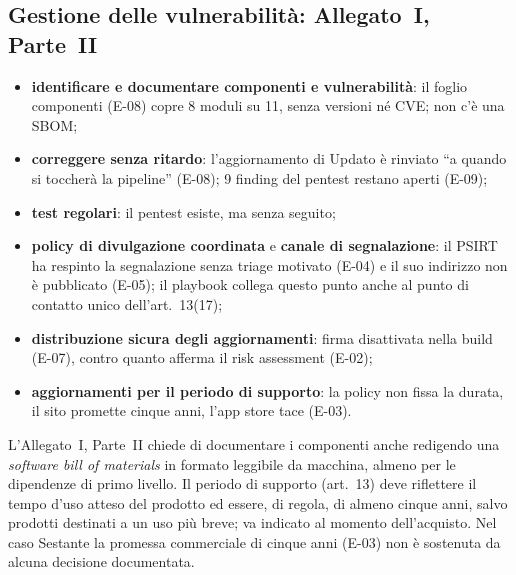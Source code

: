 \subsection{Gestione delle vulnerabilità: Allegato~I, Parte~II}
\begin{itemize}
  \item \textbf{identificare e documentare componenti e vulnerabilità}: il foglio componenti (E-08)
    copre 8 moduli su 11, senza versioni né CVE; non c'è una SBOM;
  \item \textbf{correggere senza ritardo}: l'aggiornamento di Updato è rinviato ``a quando si
    toccherà la pipeline'' (E-08); 9 finding del pentest restano aperti (E-09);
  \item \textbf{test regolari}: il pentest esiste, ma senza seguito;
  \item \textbf{policy di divulgazione coordinata} e \textbf{canale di segnalazione}: il PSIRT ha
    respinto la segnalazione senza triage motivato (E-04) e il suo indirizzo non è pubblicato (E-05);
    il playbook collega questo punto anche al punto di contatto unico dell'art.~13(17);
  \item \textbf{distribuzione sicura degli aggiornamenti}: firma disattivata nella build (E-07),
    contro quanto afferma il risk assessment (E-02);
  \item \textbf{aggiornamenti per il periodo di supporto}: la policy non fissa la durata, il sito
    promette cinque anni, l'app store tace (E-03).
\end{itemize}

\begin{integrazione}
L'Allegato~I, Parte~II chiede di documentare i componenti anche redigendo una \emph{software bill of
materials} in formato leggibile da macchina, almeno per le dipendenze di primo livello. Il periodo di
supporto (art.~13) deve riflettere il tempo d'uso atteso del prodotto ed essere, di regola, di almeno
cinque anni, salvo prodotti destinati a un uso più breve; va indicato al momento dell'acquisto. Nel
caso Sestante la promessa commerciale di cinque anni (E-03) non è sostenuta da alcuna decisione
documentata.
\end{integrazione}


